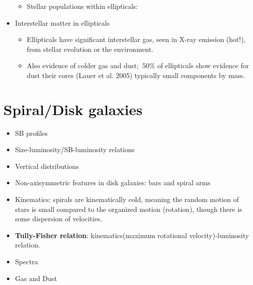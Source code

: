 \documentclass[12pt]{article}
\begin{document}
\begin{itemize}
\begin{itemize}
    \item Stellar populations within ellipticals:
  \end{itemize}
  \item Interstellar matter in ellipticals
  \begin{itemize}
    \item Ellipticals have significant interstellar gas, seen in X-ray
    emission (hot!), from stellar evolution or the environment.
    \item Also evidence of colder gas and dust; $~50\%$ of ellipticals
    show evidence for dust their cores (Lauer et al. 2005)
    typically small components by mass.
  \end{itemize}
\end{itemize}



\section{Spiral/Disk galaxies}
    \begin{itemize}
      \item SB profiles
      \item Size-luminosity/SB-luminosity relations
      \item Vertical distributions
      \item Non-axisymmetric features in disk galaxies: bars and
      spiral arms
      \item Kinematics: spirals are kinematically cold, meaning the
      random motion of stars is small compared to the organized motion
      (rotation), though there is some dispersion of velocities.
      \item \textbf{Tully-Fisher relation}: kinematics(maximum
      rotational velocity)-luminosity relation.
      \item Spectra
      \item Gas and Dust
    \end{itemize}

\end{document}
